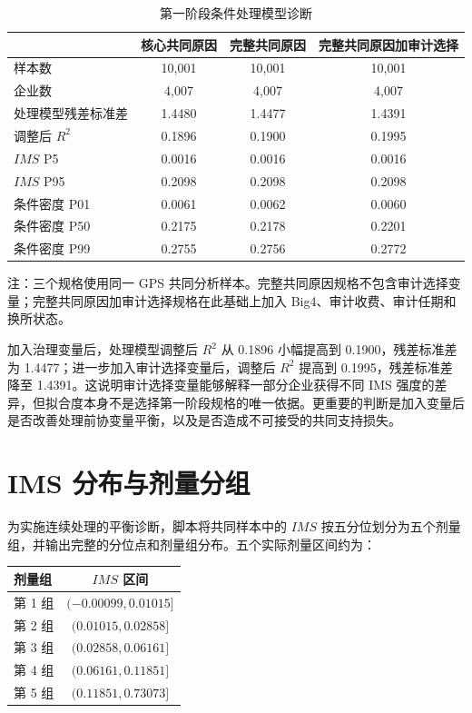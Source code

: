 \documentclass[11pt]{article}
\begin{document}
\begin{table}[htbp]
\centering
\begin{threeparttable}
\caption{第一阶段条件处理模型诊断}
\begin{tabular}{lccc}
\toprule
 & 核心共同原因 & 完整共同原因 & 完整共同原因加审计选择 \\
\midrule
样本数 & 10,001 & 10,001 & 10,001 \\
企业数 & 4,007 & 4,007 & 4,007 \\
处理模型残差标准差 & 1.4480 & 1.4477 & 1.4391 \\
调整后 $R^2$ & 0.1896 & 0.1900 & 0.1995 \\
$IMS$ P5 & 0.0016 & 0.0016 & 0.0016 \\
$IMS$ P95 & 0.2098 & 0.2098 & 0.2098 \\
条件密度 P01 & 0.0061 & 0.0062 & 0.0060 \\
条件密度 P50 & 0.2175 & 0.2178 & 0.2201 \\
条件密度 P99 & 0.2755 & 0.2756 & 0.2772 \\
\bottomrule
\end{tabular}
\begin{tablenotes}\footnotesize
\item 注：三个规格使用同一 GPS 共同分析样本。完整共同原因规格不包含审计选择变量；完整共同原因加审计选择规格在此基础上加入 Big4、审计收费、审计任期和换所状态。
\end{tablenotes}
\end{threeparttable}
\end{table}

加入治理变量后，处理模型调整后 $R^2$ 从 0.1896 小幅提高到 0.1900，残差标准差为 1.4477；进一步加入审计选择变量后，调整后 $R^2$ 提高到 0.1995，残差标准差降至 1.4391。这说明审计选择变量能够解释一部分企业获得不同 IMS 强度的差异，但拟合度本身不是选择第一阶段规格的唯一依据。更重要的判断是加入变量后是否改善处理前协变量平衡，以及是否造成不可接受的共同支持损失。

\section{IMS 分布与剂量分组}

为实施连续处理的平衡诊断，脚本将共同样本中的 $IMS$ 按五分位划分为五个剂量组，并输出完整的分位点和剂量组分布。五个实际剂量区间约为：
\begin{center}
\begin{tabular}{lc}
\toprule
剂量组 & $IMS$ 区间 \\
\midrule
第 1 组 & $(-0.00099, 0.01015]$ \\
第 2 组 & $(0.01015, 0.02858]$ \\
第 3 组 & $(0.02858, 0.06161]$ \\
第 4 组 & $(0.06161, 0.11851]$ \\
第 5 组 & $(0.11851, 0.73073]$ \\
\bottomrule
\end{tabular}
\end{center}
\end{document}
